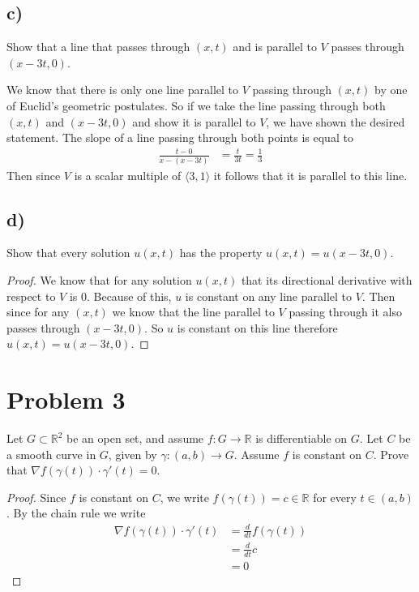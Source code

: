 \documentclass{article}
\theoremstyle{definition}
\begin{document}
    \subsection*{c)}
        \begin{mdframed}
            Show that a line that passes through $(x,t)$ and is parallel to $V$ passes through $(x-3t,0)$.
        \end{mdframed}
        We know that there is only one line parallel to $V$ passing through $(x,t)$ by one of Euclid's geometric postulates.
        So if we take the line passing through both $(x,t)$ and $(x-3t,0)$ and show it is parallel to $V$, we have shown the desired statement.
        The slope of a line passing through both points is equal to 
        \begin{align*}
            \frac{t-0}{x - (x-3t)} & = \frac{t}{3t} = \frac{1}{3}
        \end{align*}
        Then since $V$ is a scalar multiple of $\langle 3,1\rangle $ it follows that it is parallel to this line.
    \subsection*{d)}
        \begin{mdframed}
            Show that every solution $u(x,t)$ has the property $u(x,t) = u(x - 3t, 0)$.
        \end{mdframed}
        \begin{proof}
            We know that for any solution $u(x,t)$ that its directional derivative with respect to $V$ is 0.
            Because of this, $u$ is constant on any line parallel to $V$.
            Then since for any $(x,t)$ we know that the line parallel to $V$ passing through 
            it also passes through $(x - 3t, 0)$. So $u$ is constant on this line therefore
            $u(x,t) = u(x-3t,0)$.
        \end{proof}
\section*{Problem 3}
    \begin{mdframed}
        Let $G \subset \mathbb{R}^2$ be an open set, and assume $f : G \rightarrow \mathbb{R}$ is differentiable 
        on $G$. Let $C$ be a smooth curve in $G$, given by $\gamma:(a,b) \rightarrow G$.
        Assume $f$ is constant on $C$. Prove that $\nabla f(\gamma(t)) \cdot \gamma'(t) = 0$.
    \end{mdframed}
    \begin{proof}
        Since $f$ is constant on $C$, we write $f(\gamma(t)) = c \in \mathbb{R}$ for every $t \in (a,b)$. By the chain rule we write
        \begin{align*}
            \nabla f(\gamma(t)) \cdot \gamma'(t) & = \frac{d}{dt} f(\gamma(t))\\
            &=\frac{d}{dt} c\\
            &= 0
        \end{align*}
    \end{proof}
\end{document}
